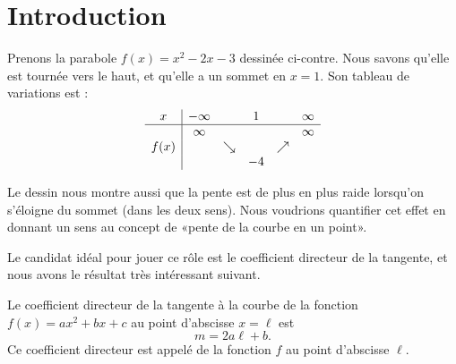 
\section{Introduction}


\begin{wrapfigure}[14]{r}{7.0cm}
            \vspace{-0.5cm}        %
                \centering
                    
                \end{wrapfigure}
Prenons la parabole \( f(x)=x^2-2x-3\) dessinée ci-contre. Nous savons qu'elle est tournée vers le haut, et qu'elle a un sommet en \( x=1\). Son tableau de variations est :
\begin{equation*}
    \begin{array}[]{c|ccccc}
        x&-\infty&&1&&\infty\\
        \hline
        &\infty&&&&\infty\\
        f(x)&&\searrow&&\nearrow&\\
        &&&-4&&\\
    \end{array}
\end{equation*}

Le dessin nous montre aussi que la pente est de plus en plus raide lorsqu'on s'éloigne du sommet (dans les deux sens). Nous voudrions quantifier cet effet en donnant un sens au concept de «pente de la courbe en un point».

Le candidat idéal pour jouer ce rôle est le coefficient directeur de la tangente, et nous avons le résultat très intéressant suivant.

\begin{Aretenir}
    Le coefficient directeur de la tangente à la courbe de la fonction \( f(x)=ax^2+bx+c\) au point d'abscisse \( x=\ell\) est
    \begin{equation}
        m=2a\ell+b.
    \end{equation}
    Ce coefficient directeur est appelé  de la fonction \( f\) au point d'abscisse \( \ell\).
\end{Aretenir}

